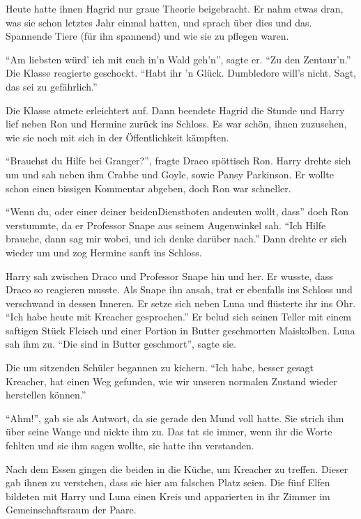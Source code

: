 Heute hatte ihnen Hagrid nur graue Theorie beigebracht. Er nahm etwas dran, was sie schon letztes Jahr einmal hatten, und sprach über dies und das. Spannende Tiere (für ihn spannend) und wie sie zu pflegen waren.

\enquote{Am liebsten würd' ich mit euch in'n Wald geh'n}, sagte er. \enquote{Zu den Zentaur'n.} Die Klasse reagierte geschockt. \enquote{Habt ihr 'n Glück. Dumbledore will's nicht. Sagt, das sei zu gefährlich.}

Die Klasse atmete erleichtert auf. Dann beendete Hagrid die Stunde und Harry lief neben Ron und Hermine zurück ins Schloss. Es war schön, ihnen zuzusehen, wie sie noch mit sich in der Öffentlichkeit kämpften.

\enquote{Brauchst du Hilfe bei Granger?}, fragte Draco spöttisch Ron. Harry drehte sich um und sah neben ihm Crabbe und Goyle, sowie Pansy Parkinson. Er wollte schon einen bissigen Kommentar abgeben, doch Ron war schneller.

\enquote{Wenn du, oder einer deiner beiden\abs Dienstboten andeuten wollt, dass\abs} doch Ron verstummte, da er Professor Snape aus seinem Augenwinkel sah. \enquote{Ich Hilfe brauche, dann sag mir wobei, und ich denke darüber nach.} Dann drehte er sich wieder um und zog Hermine sanft ins Schloss.

Harry sah zwischen Draco und Professor Snape hin und her. Er wusste, dass Draco so reagieren musste. Als Snape ihn ansah, trat er ebenfalls ins Schloss und verschwand in dessen Inneren. Er setze sich neben Luna und flüsterte ihr ins Ohr. \enquote{Ich habe heute mit Kreacher gesprochen.} Er belud sich seinen Teller mit einem saftigen Stück Fleisch und einer Portion in Butter geschmorten Maiskolben. Luna sah ihm zu. \enquote{Die sind in Butter geschmort}, sagte sie.

Die um sitzenden Schüler begannen zu kichern. \enquote{Ich habe, besser gesagt Kreacher, hat einen Weg gefunden, wie wir unseren normalen Zustand wieder herstellen können.}

\enquote{Ahm!}, gab sie als Antwort, da sie gerade den Mund voll hatte. Sie strich ihm über seine Wange und nickte ihm zu. Das tat sie immer, wenn ihr die Worte fehlten und sie ihm sagen wollte, sie hatte ihn verstanden.

Nach dem Essen gingen die beiden in die Küche, um Kreacher zu treffen. Dieser gab ihnen zu verstehen, dass sie hier am falschen Platz seien. Die fünf Elfen bildeten mit Harry und Luna einen Kreis und apparierten in ihr Zimmer im Gemeinschaftsraum der Paare.

